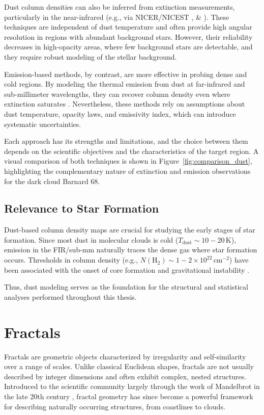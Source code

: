 Dust column densities can also be inferred from extinction measurements, particularly in the near-infrared (e.g., via NICER/NICEST , \cite{lombardi2001nicer} \& \cite{lombardi2009nicest}). These techniques are independent of dust temperature and often provide high angular resolution in regions with abundant background stars. However, their reliability decreases in high-opacity areas, where few background stars are detectable, and they require robust modeling of the stellar background.

Emission-based methods, by contrast, are more effective in probing dense and cold regions. By modeling the thermal emission from dust at far-infrared and sub-millimeter wavelengths, they can recover column density even where extinction saturates \cite{froebrich2010structure}. Nevertheless, these methods rely on assumptions about dust temperature, opacity laws, and emissivity index, which can introduce systematic uncertainties.

Each approach has its strengths and limitations, and the choice between them depends on the scientific objectives and the characteristics of the target region. A visual comparison of both techniques is shown in Figure~\ref{fig:comparison_dust}, highlighting the complementary nature of extinction and emission observations for the dark cloud Barnard 68.

\subsection{Relevance to Star Formation}

Dust-based column density maps are crucial for studying the early stages of star formation. Since most dust in molecular clouds is cold ($T_\mathrm{dust} \sim 10{-}20\,\mathrm{K}$), emission in the FIR/sub-mm naturally traces the dense gas where star formation occurs. Thresholds in column density (e.g., $N(\mathrm{H}_2) \sim 1{-}2 \times 10^{22}\,\mathrm{cm}^{-2}$) have been associated with the onset of core formation and gravitational instability \cite{lada2010star}.

Thus, dust modeling serves as the foundation for the structural and statistical analyses performed throughout this thesis.

\section{Fractals}

Fractals are geometric objects characterized by irregularity and self-similarity over a range of scales. Unlike classical Euclidean shapes, fractals are not usually described by integer dimensions and often exhibit complex, nested structures. Introduced to the scientific community largely through the work of Mandelbrot in the late 20th century \cite{cannon1984fractal}, fractal geometry has since become a powerful framework for describing naturally occurring structures, from coastlines to clouds.

